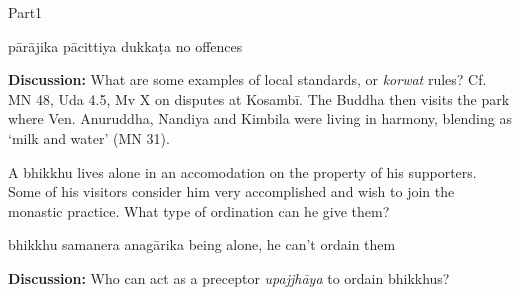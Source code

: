 \documentclass[11pt,oneside]{memoir}
\begin{document}
\begin{exam}{Part1}
\begin{problem}
  \bigskip

  \begin{answers}{4}
    \bChoices
     pārājika\eAns
     pācittiya\eAns
     dukkaṭa\eAns
     no offences\eAns
    \eChoices
  \end{answers}

\end{problem}

\bigskip

\textbf{Discussion:} What are some examples of local standards, or \emph{korwat}
rules? Cf. MN 48, Uda 4.5, Mv X on disputes at Kosambī. The Buddha then visits
the park where Ven. Anuruddha, Nandiya and Kimbila were living in harmony,
blending as `milk and water' (MN 31).

\problemDivide

\begin{problem}

  A bhikkhu lives alone in an accomodation on the property of his supporters. Some of
  his visitors consider him very accomplished and wish to join the monastic practice.
  What type of ordination can he give them?

  \bigskip

  \begin{manswers}{4}
    \bChoices
     bhikkhu\eAns
     samanera\eAns
     anagārika\eAns
     being alone, he can't ordain them\eAns
    \eChoices
  \end{manswers}

\end{problem}

\bigskip

\textbf{Discussion:} Who can act as a preceptor \emph{upajjhāya} to ordain bhikkhus?

\end{exam}
\end{document}
